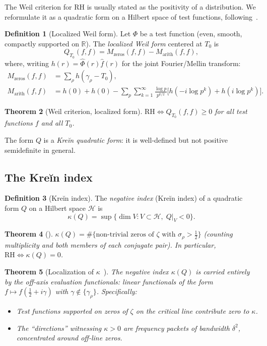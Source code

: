 \documentclass[11pt]{amsart}
\newtheorem{theorem}{Theorem}[section]
\theoremstyle{definition}
\newtheorem{definition}[theorem]{Definition}
\theoremstyle{remark}
\newcommand{\RH}{\mathrm{RH}}
\newcommand{\half}{\tfrac{1}{2}}
\newcommand{\kap}{\kappa}
\newcommand{\sig}{\sigma}
\newcommand{\gam}{\gamma}
\begin{document}
The Weil criterion for RH is usually stated as the positivity of a distribution.
We reformulate it as a quadratic form on a Hilbert space of test functions, following~\cite{RP7,RP8}.

\begin{definition}[Localized Weil form]
Let $\Phi$ be a test function (even, smooth, compactly supported on $\mathbb{R}$).
The \emph{localized Weil form} centered at $T_0$ is
\[
  Q_{T_0}(f,f) = M_\text{zeros}(f,f) - M_\text{arith}(f,f),
\]
where, writing $h(r) = \hat\Phi(r)\hat f(r)$ for the joint Fourier/Mellin transform:
\begin{align*}
  M_\text{zeros}(f,f) &= \sum_\rho h(\gam_\rho - T_0), \\
  M_\text{arith}(f,f) &= h(0) + h(0)
    - \sum_p\sum_{k=1}^\infty \frac{\log p}{p^{k/2}}
    \bigl[h(-i\log p^k) + h(i\log p^k)\bigr].
\end{align*}
\end{definition}

\begin{theorem}[Weil criterion, localized form]
$\RH \Longleftrightarrow Q_{T_0}(f,f) \ge 0$ for all test functions $f$ and all $T_0$.
\end{theorem}

The form $Q$ is a \emph{Kreĭn quadratic form}: it is well-defined but not positive
semidefinite in general.

\subsection{The Kreĭn index}
\label{ss:Krein}

\begin{definition}[Kreĭn index]
The \emph{negative index} (Kreĭn index) of a quadratic form $Q$ on a Hilbert space
$\mathcal{H}$ is
\[
  \kap(Q) = \sup\{\dim V : V\subset\mathcal{H},\; Q|_V < 0\}.
\]
\end{definition}

\begin{theorem}[\cite{RP8}]
\label{thm:kappa}
$\kap(Q) = \#\{\text{non-trivial zeros of }\zeta \text{ with } \sig_\rho > \half\}$
(counting multiplicity and both members of each conjugate pair).
In particular, $\RH \Longleftrightarrow \kap(Q) = 0$.
\end{theorem}

\begin{theorem}[Localization of $\kap$~\cite{RP10,RP25}]
\label{thm:localization}
The negative index $\kap(Q)$ is carried entirely by the \emph{off-axis evaluation
functionals}: linear functionals of the form $f\mapsto f(\half + i\gam)$ with
$\gam\notin\{\gam_\rho\}$.  Specifically:
\begin{itemize}
  \item Test functions supported on \emph{zeros of $\zeta$ on the critical line}
    contribute zero to $\kap$.
  \item The ``directions'' witnessing $\kap > 0$ are frequency packets of bandwidth
    $\delta^2$, concentrated around off-line zeros.
\end{itemize}
\end{theorem}
\end{document}
